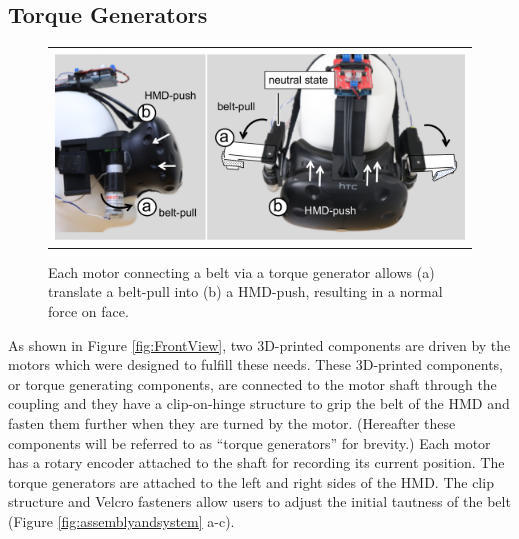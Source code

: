 \subsection{Torque Generators }

\begin{figure}[h]
\begin{center}
    \begin{tabular}{@{\hspace{0.1cm}}c}
        \includegraphics[width=1\linewidth]{figures/mechanical-design3}
    \end{tabular}
    \caption{Each motor connecting a belt via a torque generator allows (a) translate a belt-pull into (b) a HMD-push, resulting in a normal force on face.}
    \label{fig:mechanical_design}
 \end{center}
\end{figure}

As shown in Figure \ref{fig:FrontView}, two 3D-printed components are driven by the motors which were designed to fulfill these needs. These 3D-printed components, or torque generating components, are connected to the motor shaft through the coupling and they have a clip-on-hinge structure to grip the belt of the HMD and fasten them further when they are turned by the motor. (Hereafter these components will be referred to as ``torque generators'' for brevity.) Each motor has a rotary encoder attached to the shaft for recording its current position. The torque generators are attached to the left and right sides of the HMD. The clip structure and Velcro fasteners allow users to adjust the initial tautness of the belt (Figure \ref{fig:assemblyandsystem} a-c). 

